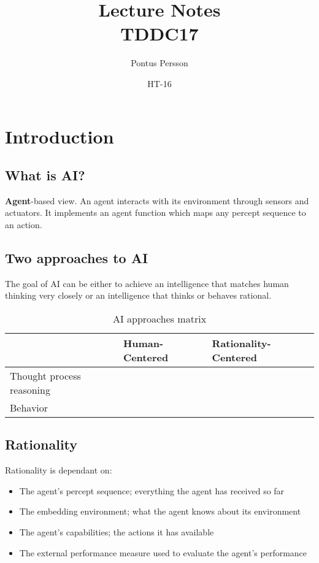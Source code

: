 \documentclass[a4paper]{article}
\author{Pontus Persson}
\title{Lecture Notes\\TDDC17}
\date{HT-16}
\begin{document}
\maketitle
\tableofcontents

\section{Introduction}


\subsection{What is AI?}
\textbf{Agent}-based view. An agent interacts with its environment through 
sensors and actuators. It implements an agent function which maps any percept
sequence to an action.
\subsection{Two approaches to AI}
The goal of AI can be either to achieve an intelligence that matches human
thinking very closely or an intelligence that thinks or behaves rational.
\begin{table}[H]
  \centering
  \begin{tabular}{|l|l|l|}
    \hline
    & Human-Centered & Rationality-Centered \\ \hline
    Thought process reasoning & & \\ \hline
    Behavior & & \\ \hline
  \end{tabular}
  \caption{AI approaches matrix}
  \label{tab:aiapproachesmatrix}
\end{table}

\subsection{Rationality}
Rationality is dependant on:
\begin{itemize}
  \item The agent's percept sequence; everything the agent has received so far
  \item The embedding environment; what the agent knows about its environment
  \item The agent's capabilities; the actions it has available
  \item The external performance measure used to evaluate the agent's
    performance
\end{itemize}
\end{document}
